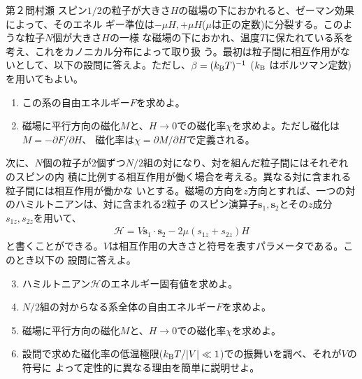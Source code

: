 \begin{question}{第２問}{村瀬}
スピン$1/2$の粒子が大きさ$H$の磁場の下におかれると、ゼーマン効果によって、そのエネル
ギー準位は$-\mu H,+\mu H$($\mu$は正の定数)に分裂する。このような粒子$N$個が大きさ$H$の一様
な磁場の下におかれ、温度$T$に保たれている系を考え、これをカノニカル分布によって取り扱
う。最初は粒子間に相互作用がないとして、以下の設問に答えよ。ただし、$\beta=(k_{\mathrm{B}} T)^{-1}$ ($k_{\mathrm{B}}$
はボルツマン定数)を用いてもよい。
\begin{enumerate}
\item
  この系の自由エネルギー$F$を求めよ。
\item
  磁場に平行方向の磁化$M$と、$H\to0$での磁化率$\chi$を求めよ。ただし磁化は$M=-\partial F/\partial H$、
  磁化率は$\chi=\partial M/\partial H$で定義される。
\end{enumerate}
次に、$N$個の粒子が2個ずつ$N/2$組の対になり、対を組んだ粒子間にはそれぞれのスピンの内
積に比例する相互作用が働く場合を考える。異なる対に含まれる粒子間には相互作用が働かな
いとする。磁場の方向を$z$方向とすれば、一つの対のハミルトニアンは、対に含まれる2粒子
のスピン演算子$\bm{s}_1,\bm{s}_2$とその$z$成分$s_{1z},s_{2z}$を用いて、
\begin{align*}
  \mathcal{H} = V\bm s_1\cdot \bm s_2 -2\mu(s_{1z}+s_{2z})H
\end{align*}
と書くことができる。$V$は相互作用の大きさと符号を表すパラメータである。このとき以下の
設問に答えよ。
\begin{enumerate}
\setcounter{enumi}{2}
\item ハミルトニアン$\mathcal H$のエネルギー固有値を求めよ。
\item $N/2$組の対からなる系全体の自由エネルギー$F$を求めよ。
\item{}
  磁場に平行方向の磁化$M$と、$H\to0$での磁化率$\chi$を求めよ。
\item
  設問で求めた磁化率の低温極限($k_{\mathrm{B}} T/|V|\ll1$)での振舞いを調べ、それが$V$の符号に
  よって定性的に異なる理由を簡単に説明せよ。
\end{enumerate}
\end{question}

